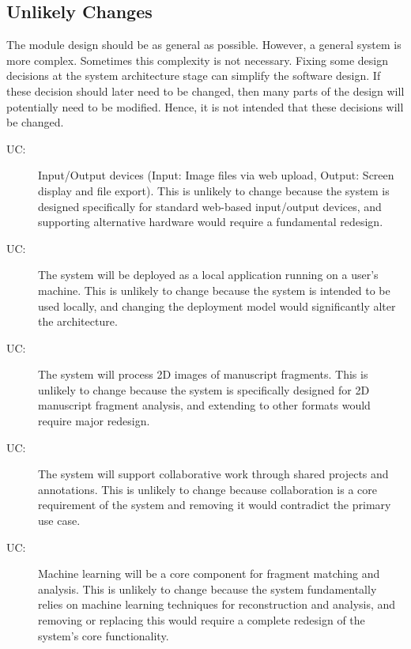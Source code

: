 \documentclass[12pt, titlepage]{article}
\newcounter{ucnum}
\newcommand{\uctheucnum}{UC\theucnum}
\begin{document}
\subsection{Unlikely Changes} \label{SecUchange}

The module design should be as general as possible. However, a general system is
more complex. Sometimes this complexity is not necessary. Fixing some design
decisions at the system architecture stage can simplify the software design. If
these decision should later need to be changed, then many parts of the design
will potentially need to be modified. Hence, it is not intended that these
decisions will be changed.

\begin{description}
\item[ \uctheucnum \label{ucIO}:] Input/Output devices
  (Input: Image files via web upload, Output: Screen display and file export). This is unlikely to change because the system is designed specifically for standard web-based input/output devices, and supporting alternative hardware would require a fundamental redesign.
\item[ \uctheucnum \label{ucWebApp}:] The system will be
  deployed as a local application running on a user's machine. This is unlikely to change because the system is intended to be used locally, and changing the deployment model would significantly alter the architecture.
\item[ \uctheucnum \label{ucImageProc}:] The system will
  process 2D images of manuscript fragments. This is unlikely to change because the system is specifically designed for 2D manuscript fragment analysis, and extending to other formats would require major redesign.
\item[ \uctheucnum \label{ucCollaborate}:] The system will
  support collaborative work through shared projects and annotations. This is unlikely to change because collaboration is a core requirement of the system and removing it would contradict the primary use case.
\item[ \uctheucnum \label{ucMLCore}:] Machine learning will
  be a core component for fragment matching and analysis. This is unlikely to change because the system fundamentally relies on machine learning techniques for reconstruction and analysis, and removing or replacing this would require a complete redesign of the system’s core functionality.
\end{description}
\end{document}
